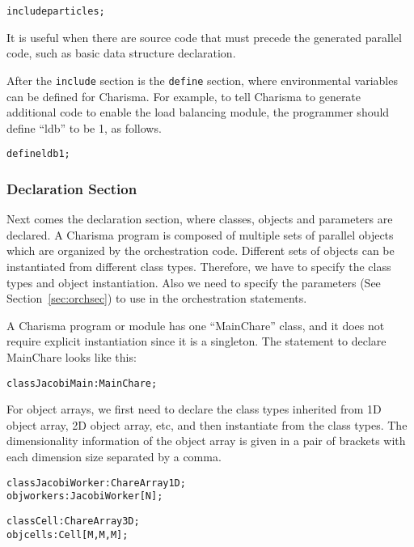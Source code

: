 \documentclass[10pt]{article}
\begin{document}
\begin{alltt}
    include particles;
\end{alltt}

It is useful when there are source code that must precede the generated
parallel code, such as basic data structure declaration. 

After the {\tt include} section is the {\tt define} section, where environmental
variables can be defined for Charisma. For example, to tell Charisma to generate
additional code to enable the load balancing module, the programmer should
define ``ldb'' to be 1, as follows.

\begin{alltt}
    define ldb 1;
\end{alltt}

\subsubsection{Declaration Section}

Next comes the declaration section, where classes, objects and parameters are
declared. A Charisma program is composed of multiple sets of parallel objects
which are organized by the orchestration code. Different sets of objects can be
instantiated from different class types. Therefore, we have to specify the class
types and object instantiation. Also we need to specify the parameters (See
Section~\ref{sec:orchsec}) to use in the orchestration statements. 

A Charisma program or module has one ``MainChare'' class, and it does not
require explicit instantiation since it is a singleton. The statement to declare
MainChare looks like this:

\begin{alltt}
    class JacobiMain : MainChare;
\end{alltt}

For object arrays, we first need to declare the class types inherited from 1D
object array, 2D object array, etc, and then instantiate from the class types. 
The dimensionality information of the object array is given in a pair of 
brackets with each dimension size separated by a comma.

\begin{alltt}
    class JacobiWorker : ChareArray1D;
    obj workers : JacobiWorker[N];

    class Cell : ChareArray3D;
    obj cells : Cell[M,M,M];
\end{alltt}
\end{document}
